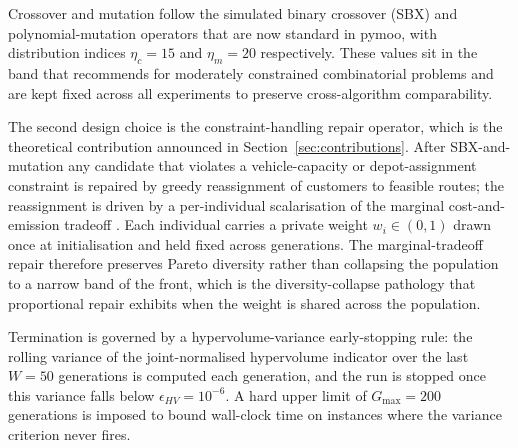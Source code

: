 \documentclass[review,preprint,authoryear,12pt]{elsarticle}
\begin{document}
Crossover and mutation follow the simulated binary crossover (SBX)
and polynomial-mutation operators that are now standard in pymoo,
with distribution indices $\eta_c = 15$ and $\eta_m = 20$
respectively. These values sit in the band that
\citet{deb2001moo_book} recommends for moderately constrained
combinatorial problems and are kept fixed across all experiments to
preserve cross-algorithm comparability.

The second design choice is the constraint-handling repair operator,
which is the theoretical contribution announced in
Section~\ref{sec:contributions}. After SBX-and-mutation any candidate
that violates a vehicle-capacity or depot-assignment constraint is
repaired by greedy reassignment of customers to feasible routes; the
reassignment is driven by a per-individual scalarisation of the
marginal cost-and-emission tradeoff
\citep{beasley1996ga_knapsack}. Each individual carries a private
weight $w_i \in (0, 1)$ drawn once at initialisation and held fixed
across generations. The marginal-tradeoff repair therefore preserves
Pareto diversity rather than collapsing the population to a narrow
band of the front, which is the diversity-collapse pathology that
proportional repair exhibits when the weight is shared across the
population.

Termination is governed by a hypervolume-variance early-stopping
rule: the rolling variance of the joint-normalised hypervolume
indicator over the last $W = 50$ generations is computed each
generation, and the run is stopped once this variance falls below
$\epsilon_{HV} = 10^{-6}$. A hard upper limit of $G_{\max} = 200$
generations is imposed to bound wall-clock time on instances where
the variance criterion never fires.
\end{document}
